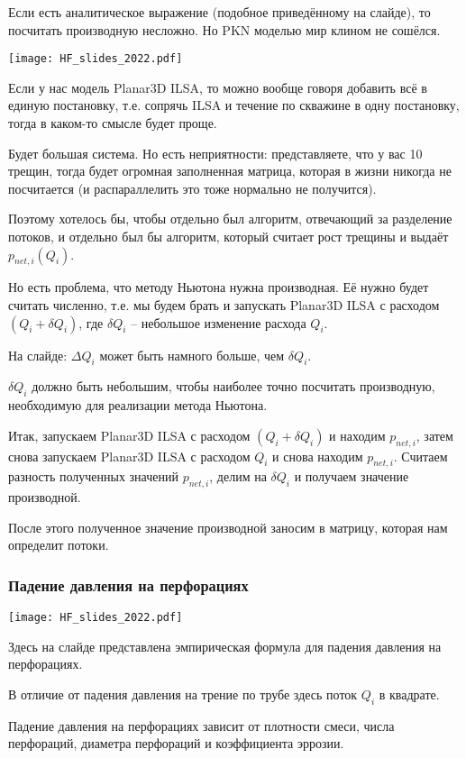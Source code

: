 \documentclass[main.tex]{subfiles}
\begin{document}
Если есть аналитическое выражение (подобное приведённому на слайде), то посчитать производную несложно.
Но PKN моделью мир клином не сошёлся.

\texttt{[image: HF\_slides\_2022.pdf]}

Если у нас модель Planar3D ILSA, то можно вообще говоря добавить всё в единую постановку, т.е. сопрячь ILSA и течение по скважине в одну постановку, тогда в каком-то смысле будет проще.

Будет большая система.
Но есть неприятности: представляете, что у вас 10 трещин, тогда будет огромная заполненная матрица, которая в жизни никогда не посчитается (и распараллелить это тоже нормально не получится).

Поэтому хотелось бы, чтобы отдельно был алгоритм, отвечающий за разделение потоков, и отдельно был бы алгоритм, который считает рост трещины и выдаёт $p_{net,i}(Q_i)$.

Но есть проблема, что методу Ньютона нужна производная.
Её нужно будет считать численно, т.е. мы будем брать и запускать Planar3D ILSA с расходом $\left(Q_i+\delta Q_i\right)$, где $\delta Q_i$ -- небольшое изменение расхода $Q_i$.

На слайде: $\Delta Q_i$ может быть намного больше, чем $\delta Q_i$.

$\delta Q_i$ должно быть небольшим, чтобы наиболее точно посчитать производную, необходимую для реализации метода Ньютона.

Итак, запускаем Planar3D ILSA с расходом $\left(Q_i+\delta Q_i\right)$ и находим $p_{net,i}$, затем снова запускаем Planar3D ILSA с расходом $Q_i$ и снова находим $p_{net,i}$.
Считаем разность полученных значений $p_{net,i}$, делим на $\delta Q_i$ и получаем значение производной.

После этого полученное значение производной заносим в матрицу, которая нам определит потоки.

\subsubsection{Падение давления на перфорациях}

\texttt{[image: HF\_slides\_2022.pdf]}

Здесь на слайде представлена эмпирическая формула для падения давления на перфорациях.

В отличие от падения давления на трение по трубе здесь поток $Q_i$ в квадрате.

Падение давления на перфорациях зависит от плотности смеси, числа перфораций, диаметра перфораций и коэффициента эррозии.
\end{document}
